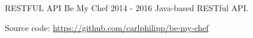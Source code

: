 \begin{cventries}
  \vspace{-2.0mm}
  \projectentry
  	{RESTFUL API} %
  	{Be My Chef} %
  	{2014 - 2016} %
    {Java-based RESTful API.\linebreak
{}
    }
    {
    \begin{projectdetails}
        	\item Source code: \href{https://github.com/carlphilipp/be-my-chef}{https://github.com/carlphilipp/be-my-chef}
    \end{projectdetails}
    }

\end{cventries}
\vspace{-2.0mm}
